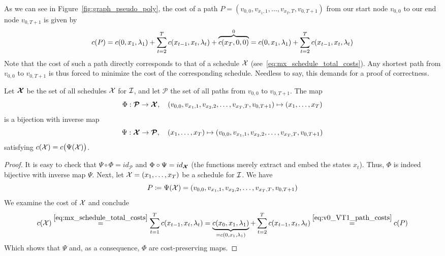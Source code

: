 As we can see in Figure~\ref{fig:graph_pseudo_poly}, the cost of a path $P=(v_{0,0},v_{x_1,1},\ldots,v_{x_T,T},v_{0,T+1})$ from our start node $v_{0,0}$ to our end node $v_{0,T+1}$ is given by 
\begin{equation}
	c(P)=c(0,x_1,\lambda_1)+\sum\limits_{t=2}^{T}c(x_{t-1},x_{t},\lambda_{t})+\overbrace{c(x_T,0,0)}^{0}=c(0,x_1,\lambda_1)+\sum\limits_{t=2}^{T}c(x_{t-1},x_{t},\lambda_{t})\label{eq:v0_VT1_path_costs}
\end{equation}
Note that the cost of such a path directly corresponds to that of a schedule $\mathcal{X}$ (see~\eqref{eq:mx_schedule_total_costs}).
Any shortest path from $v_{0,0}$ to $v_{0,T+1}$ is thus forced to minimize the cost of the corresponding schedule. Needless to say, this demands for a proof of correctness.
\begin{lem}\label{lem:sched_path_pseudo_poly}
Let $\bm{\mathcal{X}}$ be the set of all schedules $\mathcal{X}$ for $\mathcal{I}$, and let $\bm{\mathcal{P}}$ the set of all paths from $v_{0,0}$ to $v_{0,T+1}$. The map
\begin{equation*}
	\Phi:\bm{\mathcal{P}}\rightarrow\bm{\mathcal{X}},\quad (v_{0,0},v_{x_1,1},v_{x_2,2},\ldots,v_{x_T,T},v_{0,T+1})\mapsto (x_1,\ldots,x_T)
\end{equation*}
is a bijection with inverse map
\begin{equation*}
	\Psi:\bm{\mathcal{X}}\rightarrow\bm{\mathcal{P}},\quad(x_1,\ldots,x_T)\mapsto (v_{0,0},v_{x_1,1},v_{x_2,2},\ldots,v_{x_T,T},v_{0,T+1})
\end{equation*}
satisfying $c(\mathcal{X})=c\bigl(\Psi(\mathcal{X})\bigr)$.
\end{lem}
\begin{proof}
It is easy to check that $\Psi\circ\Phi=id_{\bm{\mathcal{P}}}$ and $\Phi\circ\Psi=id_{\bm{\mathcal{X}}}$ (the functions merely extract and embed the states $x_t$). Thus, $\Phi$ is indeed bijective with inverse map $\Psi$. Next, let $\mathcal{X}=(x_1,\ldots,x_T)$ be a schedule for $\mathcal{I}$. We have
\begin{equation*}
	P\coloneqq\Psi(\mathcal{X})=(v_{0,0},v_{x_1,1},v_{x_2,2},\ldots,v_{x_T,T},v_{0,T+1})
\end{equation*}
We examine the cost of $\mathcal{X}$ and conclude
\begin{equation*}
c(\mathcal{X})\stackrel{\eqref{eq:mx_schedule_total_costs}}{=}\sum\limits_{t=1}^{T}c(x_{t-1},x_{t},\lambda_t)=\underbrace{c(x_0,x_1,\lambda_1)}_{=c(0,x_1,\lambda_1)}+\sum\limits_{t=2}^{T}c(x_{t-1},x_{t},\lambda_t)\stackrel{\eqref{eq:v0_VT1_path_costs}}{=}c(P)
\end{equation*}
Which shows that $\Psi$ and, as a consequence, $\Phi$ are cost-preserving maps.
\end{proof}
